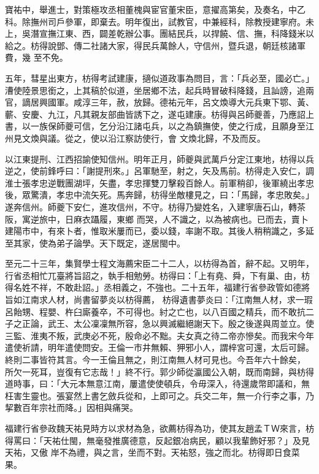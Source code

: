 \begin{pinyinscope}
 寶祐中，舉進士，對策極攻丞相董槐與宦官董宋臣，意擢高第矣，及奏名，中乙科。除撫州司戶參軍，即棄去。明年復出，試教官，中兼經科，除教授建寧府。未上，吳潛宣撫江東、西，闢差乾辦公事。團結民兵，以捍饒、信、撫，科降錢米以給之。枋得說鄧、傳二社諸大家，得民兵萬餘人，守信州，暨兵退，朝廷核諸軍費，幾
 至不免。



 五年，彗星出東方，枋得考試建康，擿似道政事為問目，言：「兵必至，國必亡。」漕使陸景思銜之，上其稿於似道，坐居鄉不法，起兵時冒破科降錢，且訕謗，追兩官，謫居興國軍。咸淳三年，赦，放歸。德祐元年，呂文煥導大元兵東下鄂、黃、蘄、安慶、九江，凡其親友部曲皆誘下之，遂屯建康。枋得與呂師夔善，乃應詔上書，以一族保師夔可信，乞分沿江諸屯兵，以之為鎮撫使，使之行成，且願身至江州見文煥與議。從之，使以沿江察訪使行，會
 文煥北歸，不及而反。



 以江東提刑、江西招諭使知信州。明年正月，師夔與武萬戶分定江東地，枋得以兵逆之，使前鋒呼曰：「謝提刑來。」呂軍馳至，射之，矢及馬前。枋得走入安仁，調淮士張孝忠逆戰團湖坪，矢盡，孝忠揮雙刀擊殺百餘人。前軍稍卻，後軍繞出孝忠後，眾驚潰，孝忠中流矢死。馬奔歸，枋得坐敵樓見之，曰：「馬歸，孝忠敗矣。」遂奔信州。師夔下安仁，進攻信州，不守。枋得乃變姓名，入建寧唐石山，轉茶阪，寓逆旅中，日麻衣躡履，東鄉
 而哭，人不識之，以為被病也。已而去，賣卜建陽市中，有來卜者，惟取米屢而已，委以錢，率謝不取。其後人稍稍識之，多延至其家，使為弟子論學。天下既定，遂居閩中。



 至元二十三年，集賢學士程文海薦宋臣二十二人，以枋得為首，辭不起。又明年，行省丞相忙兀臺將旨詔之，執手相勉勞。枋得曰：「上有堯、舜，下有巢、由，枋得名姓不祥，不敢赴詔。」丞相義之，不強也。二十五年，福建行省參政管如德將旨如江南求人材，尚書留夢炎以枋得薦，
 枋得遺書夢炎曰：「江南無人材，求一瑕呂飴甥、程嬰、杵臼廝養卒，不可得也。紂之亡也，以八百國之精兵，而不敢抗二子之正論，武王、太公凜凜無所容，急以興滅繼絕謝天下。殷之後遂與周並立。使三監、淮夷不叛，武庚必不死，殷命必不黜。夫女真之待二帝亦慘矣。而我宋今年遣使祈請，明年遣使問安。王倫一市井無賴、狎邪小人，謂梓宮可還，太后可歸。終則二事皆符其言。今一王倫且無之，則江南無人材可見也。今吾年六十餘矣，
 所欠一死耳，豈復有它志哉！」終不行。郭少師從瀛國公入朝，既而南歸，與枋得道時事，曰：「大元本無意江南，屢遣使使頓兵，令毋深入，待還歲幣即議和，無枉害生靈也。張宴然上書乞斂兵從和，上即可之。兵交二年，無一介行李之事，乃挈數百年宗社而降。」因相與痛哭。



 福建行省參政魏天祐見時方以求材為急，欲薦枋得為功，使其友趙孟ＴＷ來言，枋得罵曰：「天祐仕閩，無毫發推廣德意，反起銀冶病民，顧以我輩飾好邪？」及見天祐，又傲
 岸不為禮，與之言，坐而不對。天祐怒，強之而北。枋得即日食菜果。




\end{pinyinscope}
